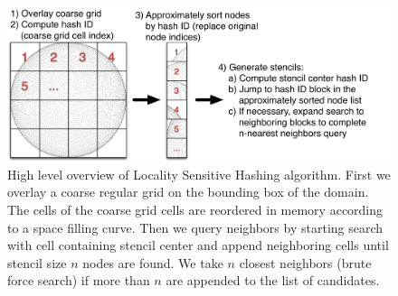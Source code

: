 
\begin{figure}
\centering
\includegraphics[width=1.0\textwidth]{../figures/chapter7/LSH_Concept.png}
\caption{High level overview of Locality Sensitive Hashing algorithm. First we overlay a coarse regular grid on the bounding box of the domain. The cells of the coarse grid cells are reordered in memory according to a space filling curve. Then we query neighbors by starting search with  cell containing stencil center and append neighboring cells until stencil size $n$ nodes are found. We take $n$ closest neighbors (brute force search) if more than $n$ are appended to the list of candidates. }
\end{figure} 

